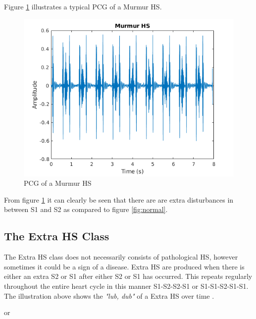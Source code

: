 \documentclass[10pt,twocolumn]{witseiepaper}
\begin{document}
Figure \ref{fig:murmur} illustrates a typical PCG of a Murmur HS.
\begin{figure}[h!]
    \centering
    \includegraphics[scale = 0.45]{./murmur.png}
    \caption{PCG of a Murmur HS}
    \label{fig:murmur}
\end{figure}{}

From figure \ref{fig:murmur} it can clearly be seen that there are are extra disturbances in between S1 and S2 as compared to figure \ref{fig:normal}.

\subsection*{The Extra HS Class}
\label{sec:extra}
The Extra HS class does not necessarily consists of pathological HS, however sometimes it could be a sign of a disease. Extra HS are produced when there is either an extra S2 or S1 after either S2 or S1 has occurred. This repeats regularly throughout the entire heart cycle in this manner S1-S2-S2-S1 or S1-S1-S2-S1-S1.
The illustration above shows the \textit{"lub, dub"} of a Extra HS over time \cite{bentley}.


\hspace{3.5cm} or 

\end{document}
